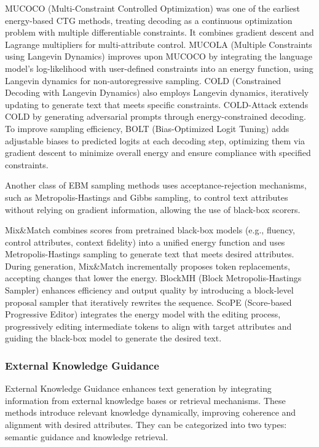 \documentclass[acmsmall, screen]{acmart}
\begin{document}
MUCOCO (Multi-Constraint Controlled Optimization) \cite{kumar_nips21_MUCOCO} was one of the earliest energy-based CTG methods, treating decoding as a continuous optimization problem with multiple differentiable constraints. It combines gradient descent and Lagrange multipliers for multi-attribute control. MUCOLA (Multiple Constraints using Langevin Dynamics) \cite{kumar_emnlp22_MUCOLA} improves upon MUCOCO by integrating the language model's log-likelihood with user-defined constraints into an energy function, using Langevin dynamics for non-autoregressive sampling. COLD (Constrained Decoding with Langevin Dynamics) \cite{qin_NEURIPS22_COLD} also employs Langevin dynamics, iteratively updating to generate text that meets specific constraints. COLD-Attack \cite{guo_arxiv24_ColdAttack} extends COLD by generating adversarial prompts through energy-constrained decoding. To improve sampling efficiency, BOLT (Bias-Optimized Logit Tuning) \cite{liu_acl23_bolt} adds adjustable biases to predicted logits at each decoding step, optimizing them via gradient descent to minimize overall energy and ensure compliance with specified constraints.

Another class of EBM sampling methods uses acceptance-rejection mechanisms, such as Metropolis-Hastings and Gibbs sampling, to control text attributes without relying on gradient information, allowing the use of black-box scorers.

Mix\&Match \cite{mireshghallah_acl22_mixandmatch} combines scores from pretrained black-box models (e.g., fluency, control attributes, context fidelity) into a unified energy function and uses Metropolis-Hastings sampling to generate text that meets desired attributes. During generation, Mix\&Match incrementally proposes token replacements, accepting changes that lower the energy. BlockMH (Block Metropolis-Hastings Sampler) \cite{forristal_conll23_BlockMH} enhances efficiency and output quality by introducing a block-level proposal sampler that iteratively rewrites the sequence. ScoPE (Score-based Progressive Editor) \cite{yu_acl24_ScoPE} integrates the energy model with the editing process, progressively editing intermediate tokens to align with target attributes and guiding the black-box model to generate the desired text.

\subsubsection{\textbf{External Knowledge Guidance}}
External Knowledge Guidance enhances text generation by integrating information from external knowledge bases or retrieval mechanisms. These methods introduce relevant knowledge dynamically, improving coherence and alignment with desired attributes. They can be categorized into two types: semantic guidance and knowledge retrieval.
\end{document}
